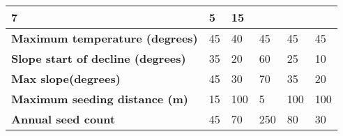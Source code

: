 \begin{longtable}{|p{4cm}|p{2cm}|p{2cm}|p{2cm}|p{2cm}|p{2cm}|}
		7 & 
		5 & 
		15 \\
		\hline
		\textbf{Maximum temperature (degrees)} & 
		45 & 
		40 & 
		45 & 
		45 & 
		45 \\
		\hline
		\textbf{Slope start of decline (degrees)} & 
		35 & 
		20 & 
		60 & 
		25 & 
		10 \\
		\hline
		\textbf{Max slope(degrees)} & 
		45 & 
		30 & 
		70 & 
		35 & 
		20 \\
		\hline
		\textbf{Maximum seeding distance (m)} & 
		15 & 
		100 & 
		5 & 
		100 & 
		100 \\
		\hline
		\textbf{Annual seed count} & 
		45 & 
		70 & 
		250 & 
		80 & 
		30 \\
		\hline                                                                           
\end{longtable}






